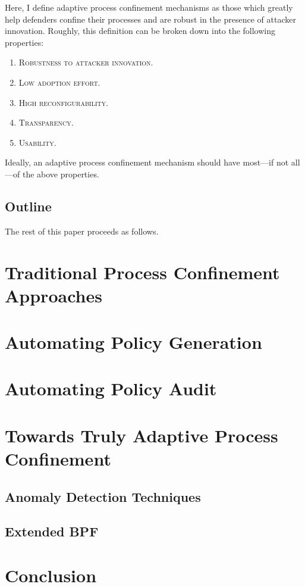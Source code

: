 \documentclass[dvipsnames, 12pt]{article}
\begin{document}
Here, I define adaptive process confinement mechanisms as those which greatly
help defenders confine their processes and are robust in the presence of
attacker innovation. Roughly, this definition can be broken down into the
following properties:
\begin{enumerate}[label=\bfseries P\arabic*., ref=P\arabic*, labelindent=2em]
    \item \label{p:1} \scshape{Robustness to attacker innovation.} 
    \item \label{p:2} \scshape{Low adoption effort.} 
    \item \label{p:3} \scshape{High reconfigurability.} 
    \item \label{p:4} \scshape{Transparency.} 
    \item \label{p:5} \scshape{Usability.} 
\end{enumerate}
Ideally, an adaptive process confinement mechanism should have most---if not
all---of the above properties.

\subsection{Outline}

The rest of this paper proceeds as follows. 

\section{Traditional Process Confinement Approaches}

\section{Automating Policy Generation}

\section{Automating Policy Audit}

\section{Towards Truly Adaptive Process Confinement}

\subsection{Anomaly Detection Techniques}

\subsection{Extended BPF}

\section{Conclusion}


\nocite{*} %
\clearpage
\printbibliography
\end{document}

